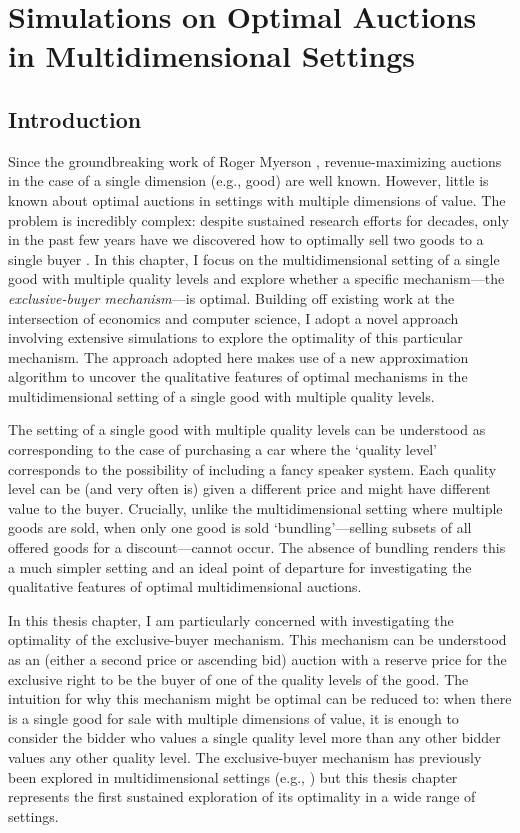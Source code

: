 \graphicspath{ {sections/} }

\chapter{Simulations on Optimal Auctions in Multidimensional Settings}\label{ch_auctions}

\section{Introduction}

Since the groundbreaking work of Roger Myerson \autocite*{myerson1981optimal}, revenue-maximizing auctions in the case of a single dimension (e.g., good) are well known. However, little is known about optimal auctions in settings with multiple dimensions of value. The problem is incredibly complex: despite sustained research efforts for decades, only in the past few years have we discovered how to optimally sell two goods to a single buyer \autocite{daskalakis2017strong}. In this chapter, I focus on the multidimensional setting of a single good with multiple quality levels and explore whether a specific mechanism---the \textit{exclusive-buyer mechanism}---is optimal. Building off existing work at the intersection of economics and computer science, I adopt a novel approach involving extensive simulations to explore the optimality of this particular mechanism. The approach adopted here makes use of a new approximation algorithm to uncover the qualitative features of optimal mechanisms in the multidimensional setting of a single good with multiple quality levels.

The setting of a single good with multiple quality levels can be understood as corresponding to the case of purchasing a car where the `quality level' corresponds to the possibility of including a fancy speaker system. Each quality level can be (and very often is) given a different price and might have different value to the buyer. Crucially, unlike the multidimensional setting where multiple goods are sold, when only one good is sold `bundling'---selling subsets of all offered goods for a discount---cannot occur. The absence of bundling renders this a much simpler setting and an ideal point of departure for investigating the qualitative features of optimal multidimensional auctions.

In this thesis chapter, I am particularly concerned with investigating the optimality of the exclusive-buyer mechanism. This mechanism can be understood as an (either a second price or ascending bid) auction with a reserve price for the exclusive right to be the buyer of one of the quality levels of the good. The intuition for why this mechanism might be optimal can be reduced to: when there is a single good for sale with multiple dimensions of value, it is enough to consider the bidder who values a single quality level more than any other bidder values any other quality level. The exclusive-buyer mechanism has previously been explored in multidimensional settings (e.g., \cite{brusco2011, belloni2010multidimensional}) but this thesis chapter represents the first sustained exploration of its optimality in a wide range of settings. 
 

